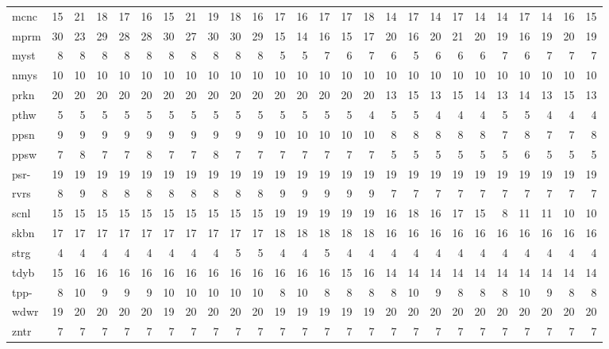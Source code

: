 \begin{center}
\begin{tabular}{lrrrrrrrrrrrrrrrrrrrrrrrrr}
mcnc & 15 & 21 & 18 & 17 & 16 & 15 & 21 & 19 & 18 & 16 & 17 & 16 & 17 & 17 & 18 & 14 & 17 & 14 & 17 & 14 & 14 & 17 & 14 & 16 & 15\\
mprm & 30 & 23 & 29 & 28 & 28 & 30 & 27 & 30 & 30 & 29 & 15 & 14 & 16 & 15 & 17 & 20 & 16 & 20 & 21 & 20 & 19 & 16 & 19 & 20 & 19\\
myst & 8 & 8 & 8 & 8 & 8 & 8 & 8 & 8 & 8 & 8 & 5 & 5 & 7 & 6 & 7 & 6 & 5 & 6 & 6 & 6 & 7 & 6 & 7 & 7 & 7\\
nmys & 10 & 10 & 10 & 10 & 10 & 10 & 10 & 10 & 10 & 10 & 10 & 10 & 10 & 10 & 10 & 10 & 10 & 10 & 10 & 10 & 10 & 10 & 10 & 10 & 10\\
prkn & 20 & 20 & 20 & 20 & 20 & 20 & 20 & 20 & 20 & 20 & 20 & 20 & 20 & 20 & 20 & 13 & 15 & 13 & 15 & 14 & 13 & 14 & 13 & 15 & 13\\
pthw & 5 & 5 & 5 & 5 & 5 & 5 & 5 & 5 & 5 & 5 & 5 & 5 & 5 & 5 & 4 & 5 & 5 & 4 & 4 & 4 & 5 & 5 & 4 & 4 & 4\\
ppsn & 9 & 9 & 9 & 9 & 9 & 9 & 9 & 9 & 9 & 9 & 10 & 10 & 10 & 10 & 10 & 8 & 8 & 8 & 8 & 8 & 7 & 8 & 7 & 7 & 8\\
ppsw & 7 & 8 & 7 & 7 & 8 & 7 & 7 & 8 & 7 & 7 & 7 & 7 & 7 & 7 & 7 & 5 & 5 & 5 & 5 & 5 & 5 & 6 & 5 & 5 & 5\\
psr- & 19 & 19 & 19 & 19 & 19 & 19 & 19 & 19 & 19 & 19 & 19 & 19 & 19 & 19 & 19 & 19 & 19 & 19 & 19 & 19 & 19 & 19 & 19 & 19 & 19\\
rvrs & 8 & 9 & 8 & 8 & 8 & 8 & 8 & 8 & 8 & 8 & 9 & 9 & 9 & 9 & 9 & 7 & 7 & 7 & 7 & 7 & 7 & 7 & 7 & 7 & 7\\
scnl & 15 & 15 & 15 & 15 & 15 & 15 & 15 & 15 & 15 & 15 & 19 & 19 & 19 & 19 & 19 & 16 & 18 & 16 & 17 & 15 & 8 & 11 & 11 & 10 & 10\\
skbn & 17 & 17 & 17 & 17 & 17 & 17 & 17 & 17 & 17 & 17 & 18 & 18 & 18 & 18 & 18 & 16 & 16 & 16 & 16 & 16 & 16 & 16 & 16 & 16 & 16\\
strg & 4 & 4 & 4 & 4 & 4 & 4 & 4 & 4 & 5 & 5 & 4 & 4 & 5 & 4 & 4 & 4 & 4 & 4 & 4 & 4 & 4 & 4 & 4 & 4 & 4\\
tdyb & 15 & 16 & 16 & 16 & 16 & 16 & 16 & 16 & 16 & 16 & 16 & 16 & 16 & 15 & 16 & 14 & 14 & 14 & 14 & 14 & 14 & 14 & 14 & 14 & 14\\
tpp- & 8 & 10 & 9 & 9 & 9 & 10 & 10 & 10 & 10 & 10 & 8 & 10 & 8 & 8 & 8 & 8 & 10 & 9 & 8 & 8 & 8 & 10 & 9 & 8 & 8\\
wdwr & 19 & 20 & 20 & 20 & 20 & 19 & 20 & 20 & 20 & 20 & 19 & 19 & 19 & 19 & 19 & 20 & 20 & 20 & 20 & 20 & 20 & 20 & 20 & 20 & 20\\
zntr & 7 & 7 & 7 & 7 & 7 & 7 & 7 & 7 & 7 & 7 & 7 & 7 & 7 & 7 & 7 & 7 & 7 & 7 & 7 & 7 & 7 & 7 & 7 & 7 & 7\\
\end{tabular}
\end{center}
